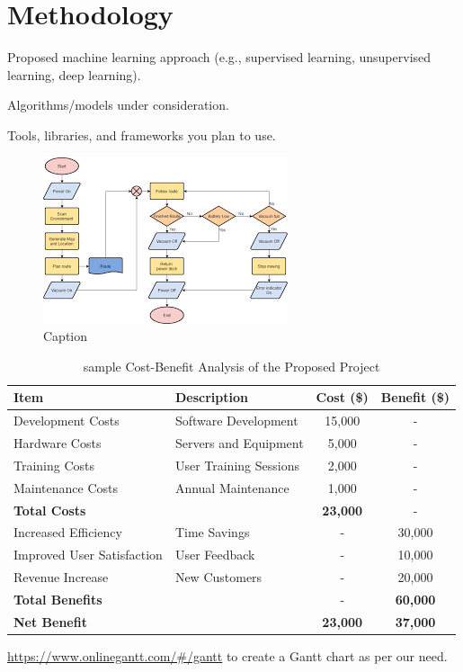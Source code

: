 \section{Methodology}
 Proposed machine learning approach (e.g., supervised learning, unsupervised learning, deep learning).
    
Algorithms/models under consideration.

Tools, libraries, and frameworks you plan to use.

\begin{figure}[h]
    \centering
    \includegraphics[width=0.5\linewidth]{Images/flow.png}
    \caption{Caption}
    \label{fig:enter-label}
\end{figure}

\begin{table}[h]
    \centering
    \caption{sample Cost-Benefit Analysis of the Proposed Project}
    \begin{tabular}{@{}llcc@{}}
        \toprule
        \textbf{Item} & \textbf{Description} & \textbf{Cost (\$)} & \textbf{Benefit (\$)} \\ \midrule
        Development Costs & Software Development & 15,000 & - \\
        Hardware Costs & Servers and Equipment & 5,000 & - \\
        Training Costs & User Training Sessions & 2,000 & - \\
        Maintenance Costs & Annual Maintenance & 1,000 & - \\
        \midrule
        \textbf{Total Costs} &  & \textbf{23,000} & - \\ \midrule
        Increased Efficiency & Time Savings & - & 30,000 \\
        Improved User Satisfaction & User Feedback & - & 10,000 \\
        Revenue Increase & New Customers & - & 20,000 \\
        \midrule
        \textbf{Total Benefits} &  & - & \textbf{60,000} \\ \midrule
        \textbf{Net Benefit} &  & \textbf{23,000} & \textbf{37,000} \\ 
        \bottomrule
    \end{tabular}
    \label{tab:cost-benefit}
\end{table}

 


\url{https://www.onlinegantt.com/#/gantt} to create a Gantt chart as per our need.
  
